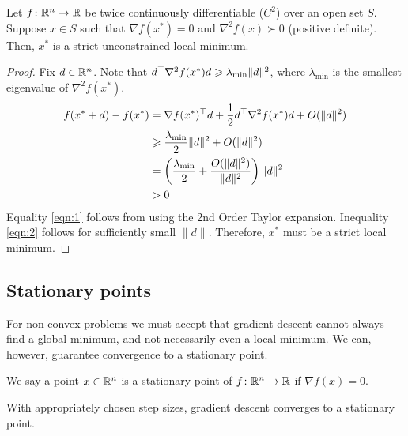 \begin{proposition}
    Let $f\colon \mathbb{R}^n \to \mathbb{R}$ be twice continuously differentiable ($C^2$) over an open set $S$. Suppose $x \in S$ such that $\nabla f(x^*) = 0$ and $\nabla^2f(x) \succ 0$ (positive definite). Then, $x^*$ is a strict unconstrained local minimum.
\end{proposition}

\begin{proof}
Fix $d \in \mathbb{R}^n$. Note that $d^\top \nabla^2 f(x^*) d \geqslant \lambda_{\text{min}} \|d\|^2$, where $\lambda_\text{min}$ is the smallest eigenvalue of $\nabla^2 f(x^*)$.
\begin{align}
    f(x^* + d) - f(x^*) &= \nabla f(x^*)^\top d + \frac{1}{2}d^\top \nabla^2 f(x^*)d + O(\|d\|^2) \label{eqn:1}\\
    &\geqslant \frac{\lambda_{\text{min}}}{2} \|d\|^2 + O(\|d\|^2) \nonumber\\
    &= \left(\frac{\lambda_{\text{min}}}{2} + \frac{O(\|d\|^2)}{\|d\|^2}\right) \|d\|^2 \nonumber\\
    &> 0 \label{eqn:2}
\end{align}
Equality \ref{eqn:1} follows from using the 2nd Order Taylor expansion.
Inequality \ref{eqn:2} follows for sufficiently small $\|d\|$.
Therefore, $x^*$ must be a strict local minimum.
\end{proof}

\subsection{Stationary points}

For non-convex problems we must accept that gradient descent cannot always find
a global minimum, and not necessarily even a local minimum. We can, however,
guarantee convergence to a stationary point.

\begin{definition}
We say a point $x \in \mathbb{R}^n$ is a stationary point of $f\colon \mathbb{R}^n \to \mathbb{R}$ if
$\nabla f(x) = 0$.  
\end{definition}

\begin{proposition}
With appropriately chosen step sizes, gradient descent 
converges to a stationary point. 
\end{proposition}

